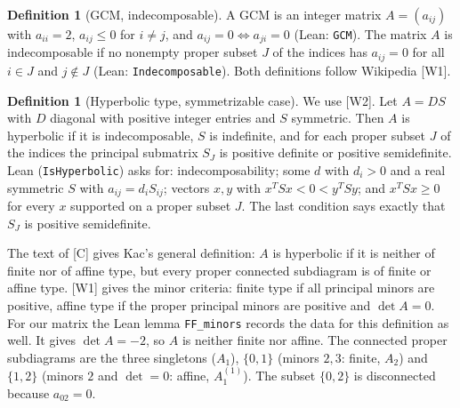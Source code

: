 \documentclass[11pt]{article}
\theoremstyle{definition}
\newtheorem{definition}[theorem]{Definition}
\begin{document}
\begin{definition}[GCM, indecomposable]
A GCM is an integer matrix $A=(a_{ij})$ with $a_{ii}=2$, $a_{ij}\le 0$ for $i\ne j$, and
$a_{ij}=0\iff a_{ji}=0$ (Lean: \texttt{GCM}). The matrix $A$ is indecomposable if no nonempty
proper subset $J$ of the indices has $a_{ij}=0$ for all $i\in J$ and $j\notin J$ (Lean:
\texttt{Indecomposable}). Both definitions follow Wikipedia [W1].
\end{definition}

\begin{definition}[Hyperbolic type, symmetrizable case]
We use [W2]. Let $A=DS$ with $D$ diagonal with positive integer entries and $S$ symmetric.
Then $A$ is hyperbolic if it is indecomposable, $S$ is indefinite, and for each proper subset
$J$ of the indices the principal submatrix $S_J$ is positive definite or positive
semidefinite. Lean (\texttt{IsHyperbolic}) asks for: indecomposability; some $d$ with $d_i>0$
and a real symmetric $S$ with $a_{ij}=d_iS_{ij}$; vectors $x,y$ with $x^TSx<0<y^TSy$; and
$x^TSx\ge 0$ for every $x$ supported on a proper subset $J$. The last condition says exactly
that $S_J$ is positive semidefinite.
\end{definition}

The text of [C] gives Kac's general definition: $A$ is hyperbolic if it is neither of finite
nor of affine type, but every proper connected subdiagram is of finite or affine type. [W1]
gives the minor criteria: finite type if all principal minors are positive, affine type if the
proper principal minors are positive and $\det A=0$. For our matrix the Lean lemma
\texttt{FF\_minors} records the data for this definition as well. It gives $\det A=-2$, so $A$ is
neither finite nor affine. The connected proper subdiagrams are the three singletons ($A_1$),
$\{0,1\}$ (minors $2,3$: finite, $A_2$) and $\{1,2\}$ (minors $2$ and $\det=0$: affine,
$A_1^{(1)}$). The subset $\{0,2\}$ is disconnected because $a_{02}=0$.
\end{document}

